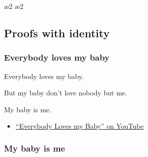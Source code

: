 \begin{frame}\footnotesize

\begin{fitchproof}
\open
{}
\open
{}
\ae{2}
\ae{2}
\close
{}
\close
{}
\end{fitchproof}
\end{frame}

\subsection{Proofs with identity}

\begin{frame}
    \frametitle{Everybody loves my baby}


\begin{earg}
\item[] Everybody loves my baby.
\item[] But my baby don't love nobody but me.
\item[\therefore] My baby is me.
\end{earg}

\bigskip

\begin{fitchproof}
\end{fitchproof}

\small\begin{itemize}
\item
\href{https://www.youtube.com/results?search_query=\%22Everybody+loves+my+baby\%22}{``Everybody
Loves my Baby'' on YouTube}
\end{itemize}

\end{frame}

\begin{frame}
  \frametitle{My baby is me}

  \begin{fitchproof}
\end{fitchproof}
\end{frame}

